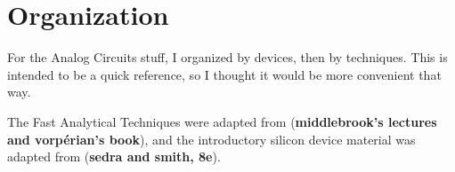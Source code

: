 \documentclass[12pt]{report}
\begin{document}
\newpage
\tableofcontents
\newpage
\chapter*{Organization}
For the Analog Circuits stuff, I organized by devices, then by techniques. This is intended to be a quick reference, so I thought it would be more convenient that way.

The Fast Analytical Techniques were adapted from (\textbf{middlebrook's lectures and vorpérian's book}), and the introductory silicon device material was adapted from (\textbf{sedra and smith, 8e}).
\newpage








\end{document}
